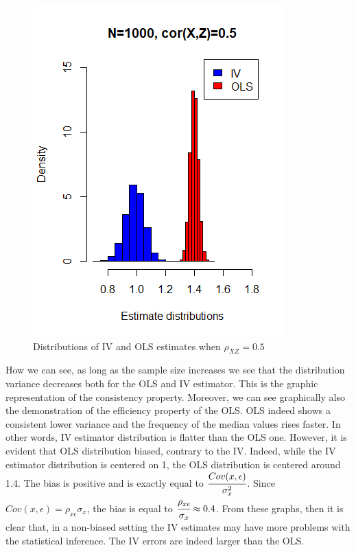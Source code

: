 \documentclass[a4paper,12pt,oneside,English]{article}
\begin{document}
\begin{figure}[p!]
\begin{minipage}[b]{0.5\linewidth}
        \includegraphics[width=\linewidth]{Fig4.png}
    \end{minipage}\hfill
    \label{Cor50}
    \caption{Distributions of IV and OLS estimates when $\rho_{XZ}=0.5$}
\end{figure}

How we can see, as long as the sample size increases we see that the distribution variance decreases both for the OLS and IV estimator. This is the graphic representation of the consistency property. Moreover, we can see graphically also the demonstration of the efficiency property of the OLS. OLS indeed shows a consistent lower variance and the frequency of the median values rises faster. In other words, IV estimator distribution is flatter than the OLS one. However, it is evident that OLS distribution biased, contrary to the IV. Indeed, while the IV estimator distribution is centered on 1, the OLS distribution is centered around 1.4. The bias is positive and is exactly equal to $\cfrac{Cov(x,\epsilon)}{\sigma^2_x}$. Since $Cov(x,\epsilon)=\rho_{x\epsilon}\sigma_x$, the bias is equal to $\cfrac{\rho_{x\epsilon}}{\sigma_x}\approx 0.4$. From these graphs, then it is clear that, in a non-biased setting the IV estimates may have more problems with the statistical inference. The IV errors are indeed larger than the OLS.
\end{document}
